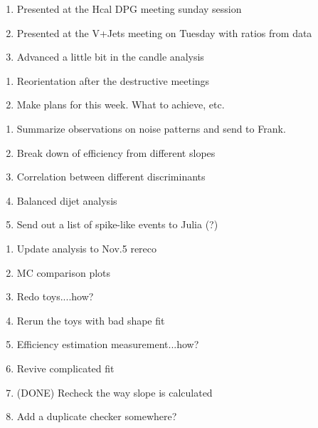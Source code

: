 

\begin{enumerate}
\item Presented at the Hcal DPG meeting sunday session
\item Presented at the V+Jets meeting on Tuesday with ratios from data
\item Advanced a little bit in the candle analysis
\end{enumerate}


\begin{enumerate}
\item Reorientation after the destructive meetings
\item Make plans for this week.  What to achieve, etc.
\end{enumerate}


\begin{enumerate}
\item Summarize observations on noise patterns and send to Frank.
\item Break down of efficiency from different slopes
\item Correlation between different discriminants
\item Balanced dijet analysis
\item Send out a list of spike-like events to Julia (?)
\end{enumerate}



\begin{enumerate}
\item Update analysis to Nov.5 rereco
\item MC comparison plots
\item Redo toys....how?
\item Rerun the toys with bad shape fit
\item Efficiency estimation measurement...how?
\item Revive complicated fit
\item (DONE) Recheck the way slope is calculated
\item Add a duplicate checker somewhere?
\end{enumerate}


